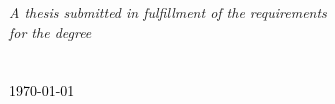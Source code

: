 \documentclass[
    11pt, %
    english, %
    doublespacing, %
    nolistspacing, %
    single
    parskip, %
    headsepline, %
]{MastersDoctoralThesis} %
\begin{document}
\begin{titlepage}
\begin{center}
            \vfill

            \large \textit{A thesis submitted in fulfillment of the requirements\\ for the degree }\\[0.2cm]
            \huge \degreename\\[0.6cm]
            \large \deptname\\[0.2cm]
            \vfill
            \textcolor{black}{\large \today}\\ %

            \vfill
        \end{center}
    \end{titlepage}
\end{document}
